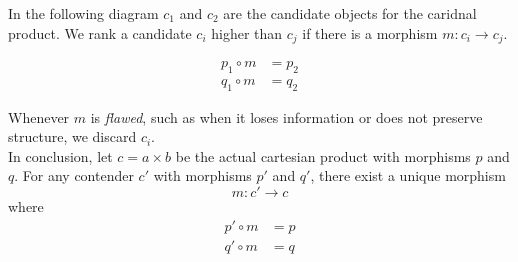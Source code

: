 \documentclass{article}
\begin{document}
In the following diagram \(c_1\) and \(c_2\) are the candidate objects
for the caridnal product.
We rank a candidate \(c_i\) higher than \(c_j\) if there is a morphism
\(m:c_i \to c_j\).

\begin{minipage}{0.5\textwidth}
\end{minipage}
\begin{minipage}{0.5\textwidth}
    \begin{align*}
        p_1 \circ m &= p_2 \\
        q_1 \circ m &= q_2
    \end{align*}
\end{minipage}

Whenever \(m\) is \textit{flawed}, such as when it loses information
or does not preserve structure, we discard \(c_i\). \\
In conclusion, let \(c=a \times b\) be the actual cartesian product
with morphisms \(p\) and \(q\).
For any contender \(c'\) with morphisms \(p'\) and \(q'\),
there exist a unique morphism
\[
    m:c'\to c
\]
where
\begin{align*}
    p' \circ m &= p \\
    q' \circ m &= q
\end{align*}
\end{document}
